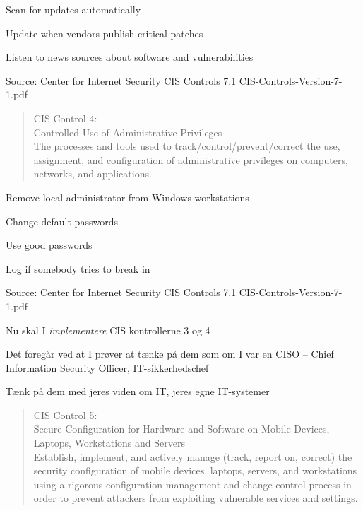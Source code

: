 \documentclass[Screen16to9,17pt]{foils}
\begin{document}
\begin{list1}
\item Scan for updates automatically
\item Update when vendors publish critical patches
\item Listen to news sources about software and vulnerabilities
\end{list1}

Source: Center for Internet Security CIS Controls 7.1 CIS-Controls-Version-7-1.pdf




\begin{quote}
CIS Control 4:\\
Controlled Use of Administrative Privileges\\
The processes and tools used to track/control/prevent/correct the use, assignment, and configuration of administrative privileges on computers, networks, and applications.
\end{quote}

\begin{list1}
\item Remove local administrator from Windows workstations
\item Change default passwords
\item Use good passwords
\item Log if somebody tries to break in
\end{list1}

Source: Center for Internet Security CIS Controls 7.1 CIS-Controls-Version-7-1.pdf





\begin{list2}
\item Nu skal I \emph{implementere} CIS kontrollerne 3 og 4
\item Det foregår ved at I prøver at tænke på dem som om I var en CISO -- Chief Information Security Officer, IT-sikkerhedschef
\item Tænk på dem med jeres viden om IT, jeres egne IT-systemer
\end{list2}




\begin{quote}
CIS Control 5:\\
Secure Configuration for Hardware and Software on Mobile Devices, Laptops, Workstations and Servers\\
Establish, implement, and actively manage (track, report on, correct) the security configuration of mobile devices, laptops, servers, and workstations using a rigorous configuration management and change control process in order to prevent attackers from exploiting vulnerable services and settings.
\end{quote}
\end{document}
